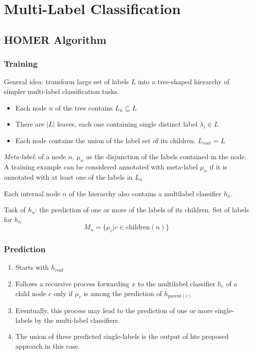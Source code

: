 \chapter{Multi-Label Classification}
\section{HOMER Algorithm}
\subsection{Training}
General idea: transform large set of labels $L$ into a tree-shaped
hierarchy of simpler multi-label classification tasks.
\begin{itemize}
    \item Each node $n$ of the tree contains $L_n \subseteq L$
    \item There are $|L|$ leaves, each one containing single distinct
        label $\lambda_i \in L$
    \item Each node contains the union of the label set of its children.
        $L_{root} = L$
\end{itemize}

\emph{Meta-label}: of a node $n$, $\mu_n$ as the disjunction of the labels
contained in the node. A training example can be considered annotated with
meta-label $\mu_n$ if it is annotated with at least one of the labels in
$L_n$

Each internal node $n$ of the hierarchy also contains a multilabel
classifier $h_n$. 

Task of $h_n$: the prediction of one or more of the labels of its
children. Set of labels for $h_n$
\[
    M_n = \{ \mu_c | c \in \mbox{children}(n)\}
\]


\subsection{Prediction}
\begin{enumerate}
    \item Starts with $h_{root}$
    \item Follows a recursive process forwarding $x$ to the multilabel
        classifier $h_c$ of a child node $c$ only if $\mu_c$ is among the
        prediction of $h_{\mbox{parent}(c)}$
    \item Eventually, this process may lead to the prediction of one or
        more single-labels by the multi-label classifiers.
    \item The union of these predicted single-labels is the output of hte
        proposed approach in this case.
\end{enumerate}
